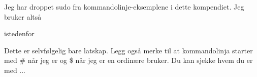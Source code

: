 \begin{remark}
Jeg har droppet sudo fra kommandolinje-eksemplene i dette kompendiet. Jeg bruker altså


istedenfor


Dette er selvfølgelig bare latskap. Legg også merke til at kommandolinja starter 
med \# når jeg er  og \$ når jeg er en ordinære bruker. 
Du kan sjekke hvem du er med  ...
\end{remark}

